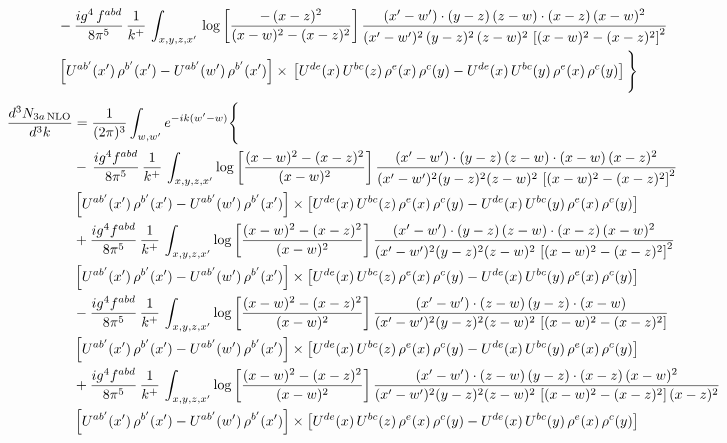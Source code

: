 \documentclass[9pt]{article}
\numberwithin{equation}{section}
\begin{document}
\begin{align}
& -\frac{ig^{4}\, f^{abd}}{8\pi^{5}}\, \frac{1}{k^{+}}\, \int_{x,y,z,x'}\,\log{\left[\frac{-\, (x-z)^{2}}{(x-w)^{2}-(x-z)^{2}}\right]}\,\frac{(x'-w')\cdot (y-z)\, (z-w)\cdot (x-z)\,(x-w)^{2}}{(x'-w')^{2}\, (y-z)^{2}\, (z-w)^{2}\,\left[(x-w)^{2}-(x-z)^{2}\right]^{2}}\, \notag \\ & \left[U^{ab'}(x')\,\rho^{b'}(x')-U^{ab'}(w')\, \rho^{b'}(x')\right]\times\,\left[U^{de}(x)\,U^{bc}(z)\, \rho^{e}(x)\,\rho^{c}(y)-U^{de}(x)\,U^{bc}(y)\,\rho^{e}(x)\,\rho^{c}(y)\right]\Bigg\}
\end{align}
\begin{align}
\frac{d^{3}N_{3a\,\rm NLO}}{d^{3}k} & = \frac{1}{(2\pi)^{3}}\int_{w,w'}e^{-ik(w'-w)}\Bigg\{\notag \\
& -\,\frac{ig^{4}f^{abd}}{8\pi^{5}}\,\frac{1}{k^{+}}\,\int_{x,y,z,x'}\log{\left[\frac{(x-w)^{2}-(x-z)^{2}}{(x-w)^{2}}\right]}\,
\frac{(x'-w')\cdot(y-z)\,(z-w)\cdot(x-w)\,(x-z)^{2}}{(x'-w')^{2}(y-z)^{2}(z-w)^{2}\,\left[(x-w)^{2}-(x-z)^{2}\right]^{2}}\notag \\ & \left[U^{ab'}(x')\,\rho^{b'}(x')-U^{ab'}(w')\, \rho^{b'}(x')\right]\times \left[U^{de}(x)\,U^{bc}(z)\, \rho^{e}(x)\,\rho^{c}(y)-U^{de}(x)\,U^{bc}(y)\,\rho^{e}(x)\,\rho^{c}(y)\right] \notag \\
& +\frac{ig^{4}f^{abd}}{8\pi^{5}}\,\frac{1}{k^{+}}\,\int_{x,y,z,x'}\log{\left[\frac{(x-w)^{2}-(x-z)^{2}}{(x-w)^{2}}\right]}\,
\frac{(x'-w')\cdot(y-z)\,(z-w)\cdot(x-z)\,(x-w)^{2}}{(x'-w')^{2}(y-z)^{2}(z-w)^{2}\,\left[(x-w)^{2}-(x-z)^{2}\right]^{2}}\notag \\ 
&\left[U^{ab'}(x')\,\rho^{b'}(x')-U^{ab'}(w')\, \rho^{b'}(x')\right]\times \left[U^{de}(x)\,U^{bc}(z)\, \rho^{e}(x)\,\rho^{c}(y)-U^{de}(x)\,U^{bc}(y)\,\rho^{e}(x)\,\rho^{c}(y)\right] \notag \\
& -\frac{ig^{4}f^{abd}}{8\pi^{5}}\,\frac{1}{k^{+}}\,\int_{x,y,z,x'}\log{\left[\frac{(x-w)^{2}-(x-z)^{2}}{(x-w)^{2}}\right]}\,
\frac{(x'-w')\cdot(z-w)\,(y-z)\cdot(x-w)}{(x'-w')^{2}(y-z)^{2}(z-w)^{2}\,\left[(x-w)^{2}-(x-z)^{2}\right]}\notag \\ & \left[U^{ab'}(x')\,\rho^{b'}(x')-U^{ab'}(w')\, \rho^{b'}(x')\right]\times \left[U^{de}(x)\,U^{bc}(z)\, \rho^{e}(x)\,\rho^{c}(y)-U^{de}(x)\,U^{bc}(y)\,\rho^{e}(x)\,\rho^{c}(y)\right] \notag \\
&  +\frac{ig^{4}f^{abd}}{8\pi^{5}}\,\frac{1}{k^{+}}\,\int_{x,y,z,x'}\log{\left[\frac{(x-w)^{2}-(x-z)^{2}}{(x-w)^{2}}\right]}\,
\frac{(x'-w')\cdot(z-w)\,(y-z)\cdot(x-z)\,(x-w)^{2}}{(x'-w')^{2}(y-z)^{2}(z-w)^{2}\,\left[(x-w)^{2}-(x-z)^{2}\right](x-z)^{2}}\notag \\ & \left[U^{ab'}(x')\,\rho^{b'}(x')-U^{ab'}(w')\, \rho^{b'}(x')\right]\times \left[U^{de}(x)\,U^{bc}(z)\, \rho^{e}(x)\,\rho^{c}(y)-U^{de}(x)\,U^{bc}(y)\,\rho^{e}(x)\,\rho^{c}(y)\right] \notag \\

\end{align}
\end{document}
